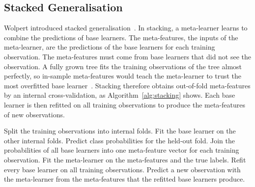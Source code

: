 \documentclass[conference]{IEEEtran}
\begin{document}
\subsection{Stacked Generalisation}
Wolpert introduced stacked generalisation~\cite{wolpert1992}. In stacking, a meta-learner learns to combine the predictions of base learners. The meta-features, the inputs of the meta-learner, are the predictions of the base learners for each training observation. The meta-features must come from base learners that did not see the observation. A fully grown tree fits the training observations of the tree almost perfectly, so in-sample meta-features would teach the meta-learner to trust the most overfitted base learner~\cite{hastie2009}. Stacking therefore obtains out-of-fold meta-features by an internal cross-validation, as Algorithm~\ref{alg:stacking} shows. Each base learner is then refitted on all training observations to produce the meta-features of new observations.

\begin{algorithm}[!t]
    \caption{Stacked generalisation with out-of-fold meta-features}
    \label{alg:stacking}
    \begin{algorithmic}[1]
        \STATE Split the training observations into internal folds.
        \STATE Fit the base learner on the other internal folds.
        \STATE Predict class probabilities for the held-out fold.
        \ENDFOR
        \ENDFOR
        \STATE Join the probabilities of all base learners into one meta-feature vector for each training observation.
        \STATE Fit the meta-learner on the meta-features and the true labels.
        \STATE Refit every base learner on all training observations.
        \STATE Predict a new observation with the meta-learner from the meta-features that the refitted base learners produce.
    \end{algorithmic}
\end{algorithm}
\end{document}
